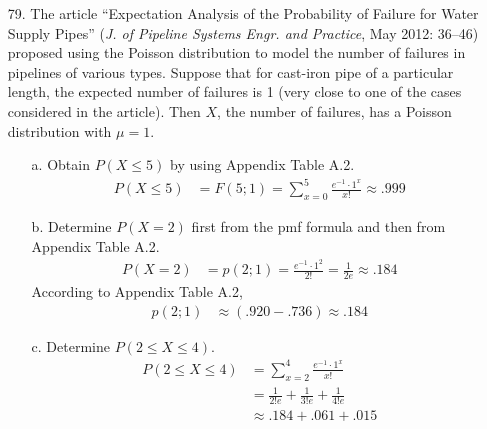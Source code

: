 \documentclass[letterpaper,12pt]{article}
\newcommand{\poisson}[2]{%
  \frac{e^{-#2} \cdot #2^{#1}}{#1!}%
}
\newcommand{\poissonsum}[3]{%
  \sum_{x = #1}^{#2} \poisson{x}{#3}%
}
\begin{document}
\maketitle

\begin{enumerate}
  \item[79.]
    The article ``Expectation Analysis of the Probability of Failure for Water Supply Pipes'' (\textit{J. of Pipeline Systems Engr. and Practice}, May 2012: 36–46) proposed using the Poisson distribution to model the number of failures in pipelines of various types. Suppose that for cast-iron pipe of a particular length, the expected number of failures is 1 (very close to one of the cases considered in the article). Then $X$, the number of failures, has a Poisson distribution with $\mu = 1$.
    \begin{enumerate}
      \item[a.]
        Obtain $P(X \le 5)$ by using Appendix Table A.2.
        \begin{align*}
          P(X \le 5) &= F(5; 1) = \poissonsum{0}{5}{1} \approx .999
        \end{align*}
      \item[b.]
        Determine $P(X = 2)$ first from the pmf formula and then from Appendix Table A.2.
        \begin{align*}
          P(X = 2) &= p(2; 1) = \poisson{2}{1} = \frac{1}{2e} \approx .184
        \end{align*}
        According to Appendix Table A.2,
        \begin{align*}
          p(2; 1) &\approx (.920 - .736) \approx .184
        \end{align*}
      \item[c.]
        Determine $P(2 \le X \le 4)$.
        \begin{align*}
          P(2 \le X \le 4) &= \poissonsum{2}{4}{1} \\
          &= \frac{1}{2!e} + \frac{1}{3!e} + \frac{1}{4!e} \\
          &\approx .184 + .061 + .015 \\

\end{align*}
\end{enumerate}
\end{enumerate}
\end{document}
